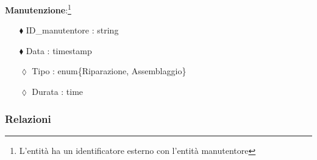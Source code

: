 \textbf{Manutenzione}:\footnote{L'entità ha un identificatore esterno con l'entità manutentore}
\begin{itemize}
\item [$\blacklozenge$] ID\_manutentore : string
\item [$\blacklozenge$] Data : timestamp
\item [$\lozenge$] Tipo : enum\{Riparazione, Assemblaggio\}
\item[$\lozenge$] Durata : time
\end{itemize}


\subsubsection{Relazioni}
